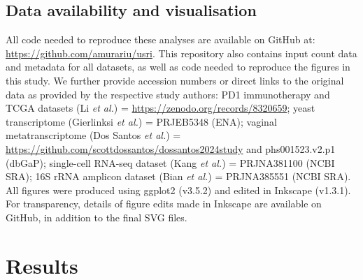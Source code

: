 \documentclass[10pt,letterpaper]{article}
\begin{document}
\subsection*{Data availability and visualisation}
All code needed to reproduce these analyses are available on GitHub at: \url{https://github.com/amurariu/usri}. This repository also contains input count data and metadata for all datasets, as well as code needed to reproduce the figures in this study. We further provide accession numbers or direct links to the original data as provided by the respective study authors: PD1 immunotherapy and TCGA datasets (Li \textit{et al.}\cite{li_exaggerated_2022}) = \url{https://zenodo.org/records/8320659};  yeast transcriptome (Gierlinksi \textit{et al.}\cite{gierlinski_statistical_2015}) = PRJEB5348 (ENA); vaginal metatranscriptome (Dos Santos \textit{et al.}\cite{dos_santos_vaginal_2024}) = \url{https://github.com/scottdossantos/dossantos2024study} and phs001523.v2.p1 (dbGaP); single-cell RNA-seq dataset (Kang \textit{et al.}\cite{kang_multiplexed_2018}) = PRJNA381100 (NCBI SRA); 16S rRNA amplicon dataset (Bian \textit{et al.}\cite{bian_gut_2017}) = PRJNA385551 (NCBI SRA). All figures were produced using ggplot2 (v3.5.2) \cite{wickham_ggplot_2016} and edited in Inkscape (v1.3.1). For transparency, details of figure edits made in Inkscape are available on GitHub, in addition to the final SVG files.





\section*{Results}
\end{document}
